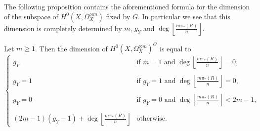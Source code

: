 The following proposition contains the aforementioned formula for the dimension of the subspace of $H^0(X,\Omega_X^{\otimes m})$ fixed by $G$.
In particular we see that this dimension is completely determined by $m$, $g_Y$ and $\deg \left\lfloor \frac{m\pi_*(R)}{n} \right\rfloor$.


    \begin{prop}\label{dim}
    Let $m\geq 1$. Then the dimension of $H^0(X,\Omega_X^{\otimes m})^G$ is equal to
        \begin{equation*}
            \begin{cases}
            g_Y & \mbox{if } m=1 \mbox{ and } \deg\left\lfloor\frac{m\pi_*(R)}{n}\right\rfloor = 0, \\
            \\
            g_Y = 1 & \mbox{if } g_Y=1 \mbox{ and } \deg\left\lfloor\frac{m\pi_*(R)}{n}\right\rfloor = 0, \\ 
            \\
            g_Y = 0 & \mbox{if } g_Y=0 \mbox{ and } \deg\left\lfloor\frac{m\pi_*(R)}{n}\right\rfloor < 2m-1, \\
            \\
            (2m-1)(g_Y-1) + \deg\left\lfloor\frac{m\pi_*(R)}{n} \right\rfloor & \mbox{otherwise}.
            \end{cases}
        \end{equation*}
    \end{prop}
